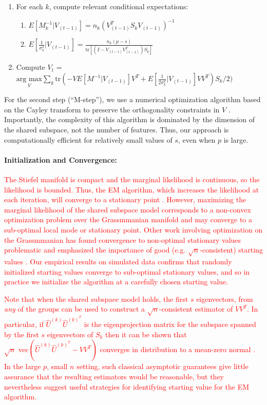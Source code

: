 \documentclass{statsoc}
\newcommand{\edits}[1]{{\textsf{\textcolor{red}{#1}}}}
\begin{document}
\begin{enumerate}
\item For each $k$, compute relevant conditional expectations:
\begin{enumerate}
\item $E[M_k^{-1} | V_{(t-1)}] = n_k(V_{(t-1)}^T S_kV_{(t-1)})^{-1}$
\item $E[\frac{1}{\sigma_k^2}|V_{(t-1)}] = \frac{n_k(p-s)}{\text{tr}[(I-V_{(t-1)}V_{(t-1)}^T)S_k]}$
\end{enumerate}
\item Compute $V_{t}$ = $\underset{V}{\text{arg } \text{max}}  \sum_k \text{tr}\left(-VE[M^{-1}|V_{(t-1)}]V^T +
       E[\frac{1}{2\sigma_k^2}|V_{(t-1)}]VV^T\right)S_k/2)$ 
\end{enumerate}

For the second step (``M-step''), we use a numerical optimization algorithm based on
the Cayley transform to preserve the orthogonality constraints in $V$
\citep{Wen2013}.  Importantly, the complexity of this algorithm is
dominated by the dimension of the shared subspace, not the number of
features.  Thus, our approach is computationally efficient for
relatively small values of $s$, even when $p$ is large.

\paragraph{Initialization and Convergence:}
\edits{The Stiefel manifold is compact and the marginal
  likelihood is continuous, so the likelihood is bounded.  Thus, the EM
  algorithm, which increases the likelihood at each iteration, will
  converge to a stationary point \citep{WuEM}. However, maximizing the
  marginal likelihood of the shared subspace model corresponds to a
  non-convex optimization problem over the Grassmmanian manifold and
  may converge to a sub-optimal local mode or stationary
  point. Other work involving optimization on the Grassmmanian has
  found convergence to non-optimal stationary values problematic and emphasized
  the importance of good (e.g. $\sqrt{n}$-consistent) starting values
  \citep{Cook2016}. Our empirical results on simulated data confirms
  that randomly initialized starting values converge to sub-optimal
  stationary values, and so in practice we initialize the algorithm at
  a carefully chosen starting value.}

\edits{Note that when the shared subspace model holds, the first $s$
  eigenvectors, from \emph{any} of the groups can be used to construct a
  $\sqrt{n}$-consistent estimator of $VV^T$.  In particular, if
  $\hat{U}^{(k)}\hat{U}^{(k)^T}$ is the eigenprojection matrix for the
  subspace spanned by the first $s$ eigenvectors of $S_k$ then it can
  be shown that
  $\sqrt{n} \text{ vec}(\hat{U}^{(k)}\hat{U}^{(k)^T} - VV^T)$
  converges in distribution to a mean-zero normal
  \citep{kollo2000}.  In the large $p$, small $n$ setting, such
  classical asymptotic guarantees give little assurance that the
  resulting estimators would be reasonable, but they nevertheless
  suggest useful strategies for identifying starting value for the EM
  algorithm.}  
\end{document}
